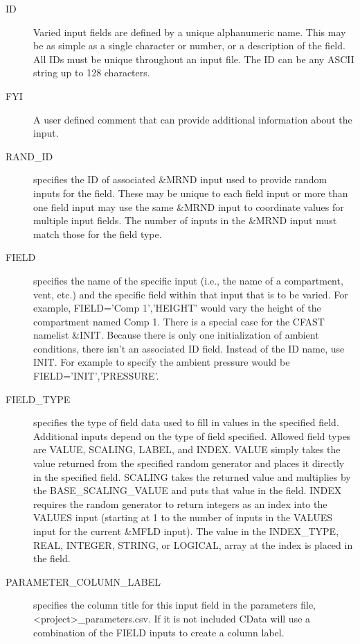 \documentclass[12pt,twoside]{book}
\begin{document}
\begin{description}
  \item[ID] Varied input fields are defined by a unique alphanumeric name. This may be as simple as a single character or number, or a description of the field. All IDs must be unique throughout an input file.  The { \ct ID} can be any ASCII string up to 128 characters.
  \item[FYI] A user defined comment that can provide additional information about the input.
  \item[RAND\_ID] specifies the ID of associated {\ct \&MRND} input used to provide random inputs for the field. These may be unique to each field input or more than one field input may use the same {\ct \&MRND} input to coordinate values for multiple input fields. The number of inputs in the {\ct \&MRND} input must match those for the field type.
  \item[FIELD] specifies the name of the specific input (i.e., the name of a compartment, vent, etc.) and the specific field within that input that is to be varied. For example, {\ct FIELD='Comp 1','HEIGHT'} would vary the height of the compartment named {\ct Comp 1}. There is a special case for the CFAST namelist {\ct \&INIT}. Because there is only one initialization of ambient conditions, there isn't an associated {\ct ID} field. Instead of the {\ct ID} name, use {\ct INIT}. For example to specify the ambient pressure would be {\ct FIELD='INIT','PRESSURE'}.
  \item[FIELD\_TYPE] specifies the type of field data used to fill in values in the specified field. Additional inputs depend on the type of field specified. Allowed field types are {\ct VALUE}, {\ct SCALING}, {\ct LABEL}, and {\ct INDEX}. {\ct VALUE} simply takes the value returned from the specified random generator and places it directly in the specified field. {\ct SCALING} takes the returned value and multiplies by the {\ct BASE\_SCALING\_VALUE} and puts that value in the field. {\ct INDEX} requires the random generator to return integers as an index into the {\ct VALUES} input (starting at 1 to the number of inputs in the {\ct VALUES} input for the current {\ct \&MFLD} input). The value in the {\ct INDEX\_TYPE}, {\ct REAL}, {\ct INTEGER}, {\ct STRING}, or {\ct LOGICAL}, array at the index is placed in the field.
  \item[PARAMETER\_COLUMN\_LABEL] specifies the column title for this input field in the parameters file, {\ct <project>\_parameters.csv}. If it is not included CData will use a combination of the {\ct FIELD} inputs to create a column label.

\end{description}
\end{document}
